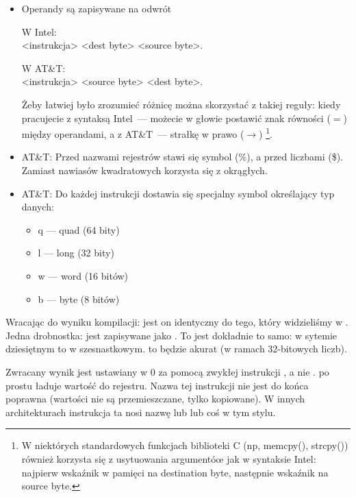 \begin{itemize}

\item
Operandy są zapisywane na odwrót

W Intel: \\
<instrukcja> <dest byte> <source byte>.

W AT\&T: \\
<instrukcja> <source byte> <dest byte>.

Żeby łatwiej było zrozumieć różnicę można skorzystać z takiej reguły:
kiedy pracujecie z syntaksą Intel~--- możecie w głowie postawić znak równości ($=$) między operandami,
a z AT\&T~--- strałkę w prawo ($\rightarrow$)
\footnote{W niektórych standardowych funkcjach biblioteki C (np, memcpy(), strcpy()) również korzysta się z usytuowania argumentóœ jak w syntaksie Intel: najpierw wskaźnik w pamięci na destination byte, 
następnie wskaźnik na source byte.}.

\item
AT\&T: Przed nazwami rejestrów stawi się symbol (\%), a przed liczbami (\$).
Zamiast nawiasów kwadratowych korzysta się z okrągłych.

\item
AT\&T: Do każdej instrukcji dostawia się specjalny symbol określający typ danych:

\begin{itemize}
\item q --- quad (64 bity)
\item l --- long (32 bity)
\item w --- word (16 bitów)
\item b --- byte (8 bitów)
\end{itemize}


\end{itemize}

Wracając do wyniku kompilacji: jest on identyczny do tego, który widzieliśmy w \IDA.
Jedna drobnostka:  jest zapisywane jako .
To jest dokładnie to samo:  w sytemie dziesiętnym to  w szesnastkowym.
 to będzie akurat  (w ramach 32-bitowych liczb).

Zwracany wynik jest ustawiany w 0 za pomocą zwykłej instrukcji \MOV, a nie \XOR.
\MOV po prostu ładuje wartość do rejestru.
Nazwa tej instrukcji nie jest do końca poprawna (wartości nie są przemieszczane, tylko kopiowane). W innych architekturach instrukcja ta nosi nazwę  lub  lub coś w tym stylu.


